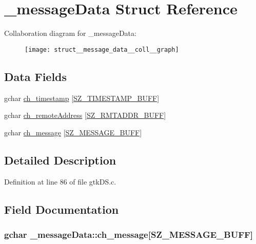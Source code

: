 \hypertarget{struct__message_data}{}\section{\+\_\+message\+Data Struct Reference}
\label{struct__message_data}


Collaboration diagram for \+\_\+message\+Data\+:\nopagebreak
\begin{figure}[H]
\begin{center}
\leavevmode
\texttt{[image: struct\_\_message\_data\_\_coll\_\_graph]}
\end{center}
\end{figure}
\subsection*{Data Fields}
\begin{DoxyCompactItemize}
\item 
gchar \hyperlink{struct__message_data_a34854aba2033bcf0a48c1915b84452bf}{ch\+\_\+timestamp} \mbox{[}\hyperlink{gtk_d_s_8c_ac08ad1b127f1c9743c5592ffb796423f}{S\+Z\+\_\+\+T\+I\+M\+E\+S\+T\+A\+M\+P\+\_\+\+B\+U\+FF}\mbox{]}
\item 
gchar \hyperlink{struct__message_data_ad7d54fd9c1f9c0f8f6592ba194d6106f}{ch\+\_\+remote\+Address} \mbox{[}\hyperlink{gtk_d_s_8c_a152ca8fa1a2eac39d1badafb6c6cef8c}{S\+Z\+\_\+\+R\+M\+T\+A\+D\+D\+R\+\_\+\+B\+U\+FF}\mbox{]}
\item 
gchar \hyperlink{struct__message_data_a26366c3de6b85c0312117e42a46093e8}{ch\+\_\+message} \mbox{[}\hyperlink{gtk_d_s_8c_ab5903aa853c3769389e570c8490feb1e}{S\+Z\+\_\+\+M\+E\+S\+S\+A\+G\+E\+\_\+\+B\+U\+FF}\mbox{]}
\end{DoxyCompactItemize}


\subsection{Detailed Description}


Definition at line 86 of file gtk\+D\+S.\+c.



\subsection{Field Documentation}
\subsubsection[{\texorpdfstring{ch\+\_\+message}{ch_message}}]{\setlength{\rightskip}{0pt plus 5cm}gchar \+\_\+message\+Data\+::ch\+\_\+message\mbox{[}{\bf S\+Z\+\_\+\+M\+E\+S\+S\+A\+G\+E\+\_\+\+B\+U\+FF}\mbox{]}}\hypertarget{struct__message_data_a26366c3de6b85c0312117e42a46093e8}{}\label{struct__message_data_a26366c3de6b85c0312117e42a46093e8}



